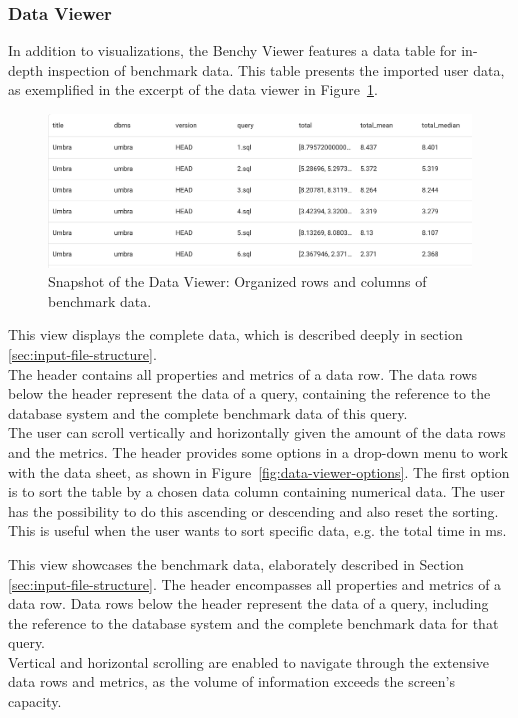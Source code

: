 \subsubsection{Data Viewer}

In addition to visualizations, the Benchy Viewer features a data table for in-depth inspection of benchmark data. This table presents the imported user data, as exemplified in the excerpt of the data viewer in Figure~\ref{fig:data-viewer}.

\begin{figure}[h]
  \centering
  \includegraphics[width=0.9\linewidth]{figures/data-viewer.png}
  \caption{Snapshot of the Data Viewer: Organized rows and columns of benchmark data.}
  \label{fig:data-viewer}
\end{figure}

This view displays the complete data, which is described deeply in section \ref{sec:input-file-structure}.\\
The header contains all properties and metrics of a data row. The data rows below the header represent the data of a query, containing the reference to the database system and the complete benchmark data of this query.\\
The user can scroll vertically and horizontally given the amount of the data rows and the metrics. The header provides some options in a drop-down menu to work with the data sheet, as shown in Figure~\ref{fig:data-viewer-options}. The first option is to sort the table by a chosen data column containing numerical data. The user has the possibility to do this ascending or descending and also reset the sorting. This is useful when the user wants to sort specific data, e.g. the total time in ms.


This view showcases the benchmark data, elaborately described in Section \ref{sec:input-file-structure}. The header encompasses all properties and metrics of a data row. Data rows below the header represent the data of a query, including the reference to the database system and the complete benchmark data for that query.\\
Vertical and horizontal scrolling are enabled to navigate through the extensive data rows and metrics, as the volume of information exceeds the screen's capacity.


